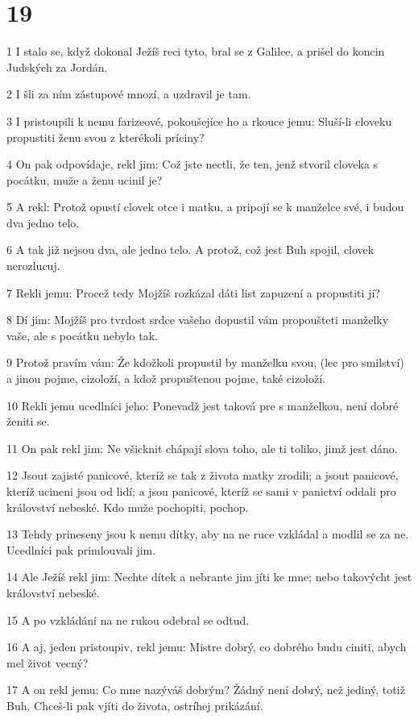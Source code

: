\chapter{19}

\par 1 I stalo se, když dokonal Ježíš reci tyto, bral se z Galilee, a prišel do koncin Judských za Jordán.
\par 2 I šli za ním zástupové mnozí, a uzdravil je tam.
\par 3 I pristoupili k nemu farizeové, pokoušejíce ho a rkouce jemu: Sluší-li cloveku propustiti ženu svou z kterékoli príciny?
\par 4 On pak odpovídaje, rekl jim: Což jste nectli, že ten, jenž stvoril cloveka s pocátku, muže a ženu ucinil je?
\par 5 A rekl: Protož opustí clovek otce i matku, a pripojí se k manželce své, i budou dva jedno telo.
\par 6 A tak již nejsou dva, ale jedno telo. A protož, což jest Buh spojil, clovek nerozlucuj.
\par 7 Rekli jemu: Procež tedy Mojžíš rozkázal dáti list zapuzení a propustiti jí?
\par 8 Dí jim: Mojžíš pro tvrdost srdce vašeho dopustil vám propoušteti manželky vaše, ale s pocátku nebylo tak.
\par 9 Protož pravím vám: Že kdožkoli propustil by manželku svou, (lec pro smilství) a jinou pojme, cizoloží, a kdož propuštenou pojme, také cizoloží.
\par 10 Rekli jemu ucedlníci jeho: Ponevadž jest taková pre s manželkou, není dobré ženiti se.
\par 11 On pak rekl jim: Ne všicknit chápají slova toho, ale ti toliko, jimž jest dáno.
\par 12 Jsout zajisté panicové, kteríž se tak z života matky zrodili; a jsout panicové, kteríž ucineni jsou od lidí; a jsou panicové, kteríž se sami v panictví oddali pro království nebeské. Kdo muže pochopiti, pochop.
\par 13 Tehdy prineseny jsou k nemu dítky, aby na ne ruce vzkládal a modlil se za ne. Ucedlníci pak primlouvali jim.
\par 14 Ale Ježíš rekl jim: Nechte dítek a nebrante jim jíti ke mne; nebo takovýcht jest království nebeské.
\par 15 A po vzkládání na ne rukou odebral se odtud.
\par 16 A aj, jeden pristoupiv, rekl jemu: Mistre dobrý, co dobrého budu ciniti, abych mel život vecný?
\par 17 A on rekl jemu: Co mne nazýváš dobrým? Žádný není dobrý, než jediný, totiž Buh. Chceš-li pak vjíti do života, ostríhej prikázání.
